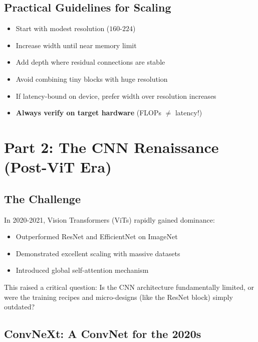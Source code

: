 \documentclass{article}
\begin{document}
\subsection{Practical Guidelines for Scaling}

\begin{tcolorbox}[colback=blue!5!white, colframe=blue!75!black, title=Rules of Thumb]
\begin{itemize}
    \item Start with modest resolution ($160$-$224$)
    \item Increase width until near memory limit
    \item Add depth where residual connections are stable
    \item Avoid combining tiny blocks with huge resolution
    \item If latency-bound on device, prefer width over resolution increases
    \item \textbf{Always verify on target hardware} (FLOPs $\neq$ latency!)
\end{itemize}
\end{tcolorbox}

\section{Part 2: The CNN Renaissance (Post-ViT Era)}

\subsection{The Challenge}

In 2020-2021, Vision Transformers (ViTs) rapidly gained dominance:
\begin{itemize}
    \item Outperformed ResNet and EfficientNet on ImageNet
    \item Demonstrated excellent scaling with massive datasets
    \item Introduced global self-attention mechanism
\end{itemize}

This raised a critical question: Is the CNN architecture fundamentally limited, or were the training recipes and micro-designs (like the ResNet block) simply outdated?

\subsection{ConvNeXt: A ConvNet for the 2020s}
\end{document}
